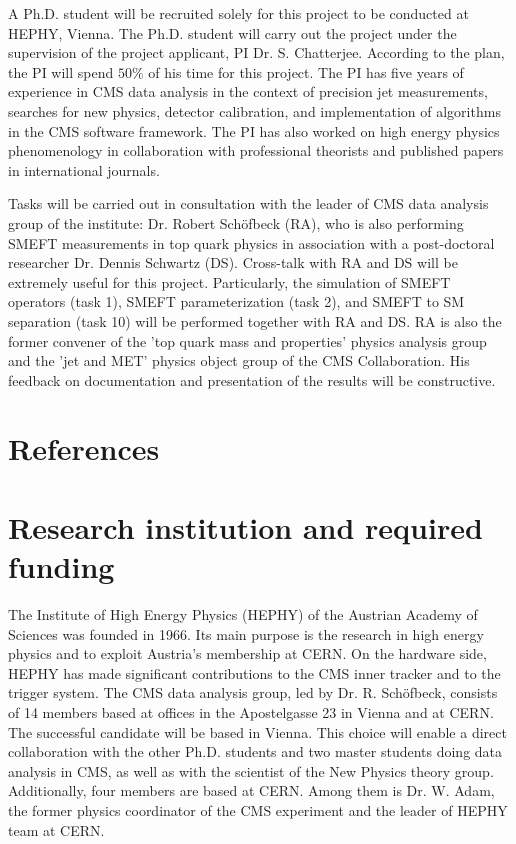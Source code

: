 \documentclass[a4paper,11pt]{article}
\begin{document}
A Ph.D. student will be recruited solely for this project to be conducted at HEPHY, Vienna. 
The Ph.D. student will carry out the project under the supervision of the project applicant, PI Dr. S. Chatterjee. 
According to the plan, the PI will spend $50\%$ of his time for this project. 
The PI has five years of experience in CMS data analysis in the context of precision jet measurements, searches for new physics, detector calibration, and implementation of algorithms in the CMS software framework. 
The PI has also worked on high energy physics phenomenology in collaboration with professional theorists and published papers in international journals. 

Tasks will be carried out in consultation with the leader of CMS data analysis group of the institute: Dr. Robert Sch{\"o}fbeck (RA), who is also performing SMEFT measurements in top quark physics in association with a post-doctoral researcher Dr. Dennis Schwartz (DS). Cross-talk with RA and DS will be extremely useful for this project. 
Particularly, the simulation of SMEFT operators (task 1), SMEFT parameterization (task 2), and SMEFT to SM separation (task 10) will be performed together with RA and DS. 
RA is also the former convener of the 'top quark mass and properties' physics analysis group and the 'jet and MET' physics object group of the CMS Collaboration. 
His feedback on documentation and presentation of the results will be constructive. 

\appendix
\renewcommand{\thesection}{Annex \arabic{section}} 

\clearpage
\section{References}
\renewcommand{\refname}{}
{


}

\newpage

\section{Research institution and required funding}

The Institute of High Energy Physics (HEPHY) of the Austrian Academy of Sciences was founded in 1966. 
Its main purpose is the research in high energy physics and to exploit Austria's membership at CERN. 
On the hardware side, HEPHY has made significant contributions to the CMS inner tracker and to the trigger system. 
The CMS data analysis group, led by Dr. R. Sch{\"o}fbeck, consists of 14 members based at offices in the Apostelgasse 23 in Vienna and at CERN. The successful candidate will be based in Vienna. 
This choice will enable a direct collaboration with the other Ph.D. students and two master students doing data analysis in CMS, as well as with the scientist of the New Physics theory group.
Additionally, four members are based at CERN. 
Among them is Dr. W. Adam, the former physics coordinator of the CMS experiment and the leader of HEPHY team at CERN.
\end{document}
